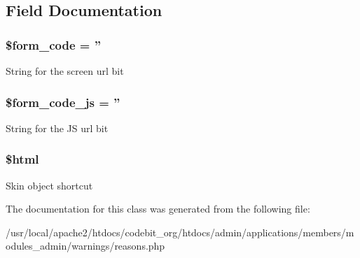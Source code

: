 \subsection{Field Documentation}
\hypertarget{classadmin__members__warnings__reasons_af28aee726fa3eb6c355d08a2ab655e03}{
\subsubsection[{\$form\-\_\-code}]{\setlength{\rightskip}{0pt plus 5cm}\$form\-\_\-code = ''}}\label{classadmin__members__warnings__reasons_af28aee726fa3eb6c355d08a2ab655e03}
String for the screen url bit \hypertarget{classadmin__members__warnings__reasons_ac68fe8a02a2efd63c3271179f4b4fbb7}{
\subsubsection[{\$form\-\_\-code\-\_\-js}]{\setlength{\rightskip}{0pt plus 5cm}\$form\-\_\-code\-\_\-js = ''}}\label{classadmin__members__warnings__reasons_ac68fe8a02a2efd63c3271179f4b4fbb7}
String for the J\-S url bit \hypertarget{classadmin__members__warnings__reasons_a6f96e7fc92441776c9d1cd3386663b40}{
\subsubsection[{\$html}]{\setlength{\rightskip}{0pt plus 5cm}\$html}}\label{classadmin__members__warnings__reasons_a6f96e7fc92441776c9d1cd3386663b40}
Skin object shortcut 

The documentation for this class was generated from the following file\-:\begin{DoxyCompactItemize}
\item 
/usr/local/apache2/htdocs/codebit\-\_\-org/htdocs/admin/applications/members/modules\-\_\-admin/warnings/reasons.\-php\end{DoxyCompactItemize}
